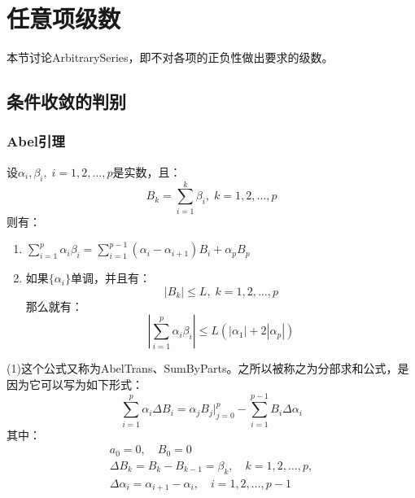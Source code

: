 \section{任意项级数}

本节讨论\gls{ArbitrarySeries}，即不对各项的正负性做出要求的级数。

\subsection{条件收敛的判别}
\subsubsection{Abel引理}
\begin{lemma}
	设$\alpha_i,\beta_i,\;i=1,2,\dots,p$是实数，且：
	\begin{equation*}
		B_k=\sum_{i=1}^k\beta_i,\;k=1,2,\dots,p
	\end{equation*}
	则有：
	\begin{enumerate}
		\item $\sum\limits_{i=1}^p\alpha_i\beta_i=\sum\limits_{i=1}^{p-1}(\alpha_i-\alpha_{i+1})B_i+\alpha_pB_p$
		\item 如果$\{\alpha_i\}$单调，并且有：
		\begin{equation*}
			|B_k|\leqslant L,\;k=1,2,\dots,p
		\end{equation*}
		那么就有：
		\begin{equation*}
			\left|\sum_{i=1}^p\alpha_i\beta_i\right|\leqslant L\left(|\alpha_1|+2|\alpha_p|\right)
		\end{equation*}
	\end{enumerate}
\end{lemma}
(1)这个公式又称为\gls{AbelTrans}、\gls{SumByParts}。之所以被称之为分部求和公式，是因为它可以写为如下形式：
\begin{equation*}
	\sum_{i=1}^p\alpha_i\Delta B_i = \alpha_jB_j\Big|_{j=0}^p-\sum_{i=1}^{p-1}B_i\Delta\alpha_i
\end{equation*}
其中：
\begin{gather*}
	a_0=0,\quad B_0=0 \\
	\Delta B_k=B_k-B_{k-1}=\beta_k,\quad k=1,2,\dots,p, \\
	\Delta\alpha_i=\alpha_{i+1}-\alpha_i,\quad i=1,2,\dots,p-1
\end{gather*}

